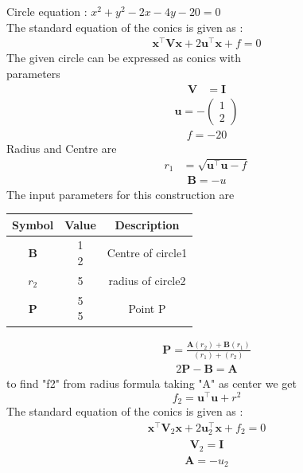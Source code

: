 \documentclass[10pt, a4paper]{article}
\newcommand{\myvec}[1]{\ensuremath{\begin{pmatrix}#1\end{pmatrix}}}
\let\vec\mathbf
\begin{document}
Circle equation : $x^2+y^2-2x-4y-20=0$\\
The standard equation of the conics is given as :
\begin{align}
\vec{x}^{\top}\vec{V}\vec{x}+2\vec{u}^{\top}\vec{x}+f=0
\end{align}
The given circle  can be expressed as conics with \\parameters
\begin{align}
	\vec{V} &= \vec{I}
	\end{align}
 \begin{align}
 \vec{u} = -\myvec{1 \\2}
 \end{align}
 \vspace{1mm}
 \begin{align}
 f = -20
	\end{align}
	Radius and Centre are
 \begin{align}
	r_1 &=\sqrt{{\vec{u}^{\top}\vec{u}}-f }
	\end{align}
    \begin{align}
 \vec{B}=-u
    \end{align}
    The input parameters for this construction are
\begin{center}
\begin{tabular}{|c|c|c|}
	\hline
	\textbf{Symbol}&\textbf{Value}&\textbf{Description}\\
	\hline
	$\vec{B}$ &\myvec{1\\2}& Centre of circle1\\
	\hline
    $r_2$ &{5}&radius of circle2\\
	\hline
 $\vec{P}$&\myvec{5\\5}&Point P\\
	\hline
\end{tabular}
\end{center}

\begin{align}
\vec{P} = \frac{\vec{A}(r_2) + \vec{B}(r_1)}{(r_1) +(r_2)}
\end{align}
\begin{align}
2\vec{P}-\vec{B} = \vec{A} 
\end{align}
\vspace{2mm}
to find "f2" from radius formula taking "A" as center we get 
\begin{equation}
f_2=\vec{u}^{\top}\vec{u} + r^2
\end{equation}
\vspace{2mm}
The standard equation of the conics is given as :
\begin{align}
	\vec{x}^{\top}\vec{V}_2\vec{x}+2\vec{u}_2^{\top}\vec{x}+f_2=0
\end{align}
\begin{align}
	\vec{V}_2 = \vec{I}
\end{align}
\begin{align}
\vec{A} = -u_2
\end{align}
\end{document}
